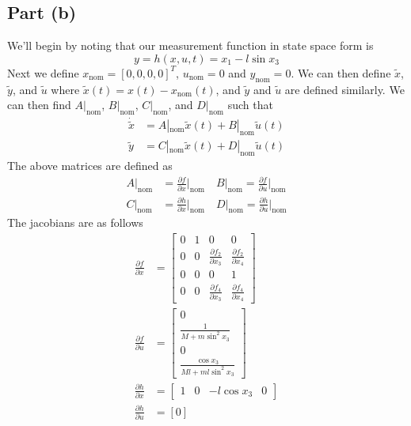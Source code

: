 \documentclass[11pt]{article}
\begin{document}
\subsection*{Part (b)}
We'll begin by noting that our measurement function in state space form is
\begin{equation*}
	y = h(x,u,t) = x_1 - l\sin x_3
\end{equation*}
Next we define $x_\text{nom} = [0,0,0,0]^T$, $u_\text{nom} = 0$ and $y_\text{nom}=0$. We can then define $\tilde{x}$, $\tilde{y}$, and $\tilde{u}$ where $\tilde{x}(t) = x(t) - x_\text{nom}(t)$, and $\tilde{y}$ and $\tilde{u}$ are defined similarly. We can then find $A|_\text{nom}$, $B|_\text{nom}$, $C|_\text{nom}$, and $D|_\text{nom}$ such that 
\begin{align*}
	\dot{\tilde{x}} &= A|_\text{nom}\tilde{x}(t) + B|_\text{nom}\tilde{u}(t) \\
	\tilde{y} &= C|_\text{nom}\tilde{x}(t) + D|_\text{nom}\tilde{u}(t)
\end{align*} 
The above matrices are defined as
\begin{align*}
	A|_\text{nom} &= \frac{\partial f}{\partial x} \Bigg|_\text{nom}\quad B|_\text{nom} = \frac{\partial f}{\partial u} \Bigg|_\text{nom} \\
	C|_\text{nom} &= \frac{\partial h}{\partial x} \Bigg|_\text{nom}\quad D|_\text{nom} = \frac{\partial h}{\partial u}\Bigg|_\text{nom}
\end{align*}
The jacobians are as follows
\begin{align*}
	\frac{\partial f}{\partial x} &= \begin{bmatrix} 0&1&0&0 \\ 0&0&\frac{\partial f_2}{\partial x_3}&\frac{\partial f_2}{\partial x_4} \\ 0&0&0&1 \\ 0&0&\frac{\partial f_4}{\partial x_3}&\frac{\partial f_4}{\partial x_4}\end{bmatrix} \\
	\frac{\partial f}{\partial u} &= \begin{bmatrix} 0 \\ \frac{1}{M+m\sin^2x_3} \\ 0 \\ \frac{\cos x_3}{Ml + ml \sin^2x_3} \end{bmatrix} \\
	\frac{\partial h}{\partial x} &= \begin{bmatrix} 1&0&-l\cos x_3&0\end{bmatrix} \\
	\frac{\partial h}{\partial u} &= [0]
\end{align*}
\end{document}
